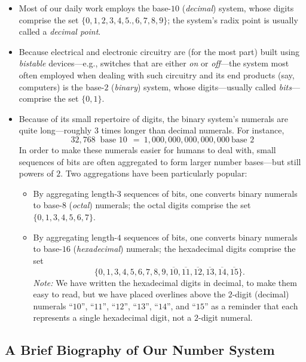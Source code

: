 \begin{itemize}
\item
Most of our daily work employs the base-$10$ ({\it decimal}) system,
whose digits comprise the set $\{0, 1, 2, 3, 4, 5., 6, 7, 8, 9\}$; the
system's radix point is usually called a {\em decimal point}.

\item
Because electrical and electronic circuitry are (for the most part)
built using {\it bistable} devices---e.g., switches that are either
{\em on} or {\em off}---the system most often employed when dealing
with such circuitry and its end products (say, computers) is the
base-$2$ ({\it binary}) system, whose digits---usually called {\it
  bits}---comprise the set $\{0, 1\}$.

\item
Because of its small repertoire of digits, the binary system's
numerals are quite long---roughly $3$ times longer than decimal
numerals.  For instance,
\[ 32,768 \ \mbox{ base $10$} \ \ = \ 1,000,000,000,000,000 \ \mbox{
  base $2$}
\]
In order to make these numerals easier for humans to deal with, small
sequences of bits are often aggregated to form larger number bases---but
still powers of $2$.  Two aggregations have been particularly popular:
  \begin{itemize}
  \item
By aggregating length-$3$ sequences of bits, one converts binary
numerals to base-$8$ ({\it octal}) numerals; the octal digits comprise
the set $\{0, 1, 3, 4, 5, 6, 7\}$.
  \item
By aggregating length-$4$ sequences of bits, one converts binary
numerals to base-$16$ ({\it hexadecimal}) numerals; the hexadecimal
digits comprise the set
\[ \{0, 1, 3, 4, 5, 6, 7, 8, 9, \overline{10}, \overline{11},
\overline{12}, \overline{13}, \overline{14}, \overline{15}\}.
\]
{\it Note:} We have written the hexadecimal digits in decimal, to make
them easy to read, but we have placed overlines above the $2$-digit
(decimal) numerals ``$10$'', ``$11$'', ``$12$'', ``$13$'', ``$14$'',
and ``$15$'' as a reminder that each represents a single hexadecimal
digit, not a $2$-digit numeral.
  \end{itemize}
\end{itemize}


\subsection{A Brief Biography of Our Number System}
\label{sec:number-taxonomy}

